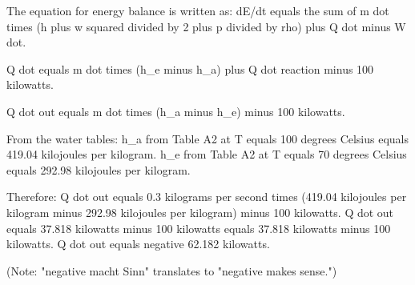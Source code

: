 The equation for energy balance is written as:  
dE/dt equals the sum of m dot times (h plus w squared divided by 2 plus p divided by rho) plus Q dot minus W dot.  

Q dot equals m dot times (h_e minus h_a) plus Q dot reaction minus 100 kilowatts.  

Q dot out equals m dot times (h_a minus h_e) minus 100 kilowatts.  

From the water tables:  
h_a from Table A2 at T equals 100 degrees Celsius equals 419.04 kilojoules per kilogram.  
h_e from Table A2 at T equals 70 degrees Celsius equals 292.98 kilojoules per kilogram.  

Therefore:  
Q dot out equals 0.3 kilograms per second times (419.04 kilojoules per kilogram minus 292.98 kilojoules per kilogram) minus 100 kilowatts.  
Q dot out equals 37.818 kilowatts minus 100 kilowatts equals 37.818 kilowatts minus 100 kilowatts.  
Q dot out equals negative 62.182 kilowatts.  

(Note: "negative macht Sinn" translates to "negative makes sense.")